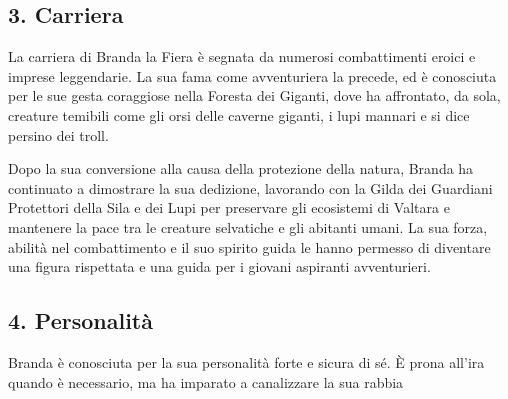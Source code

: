 \subsection{3. Carriera}\label{carriera}


La carriera di Branda la Fiera è segnata da numerosi combattimenti
eroici e imprese leggendarie. La sua fama come avventuriera la precede,
ed è conosciuta per le sue gesta coraggiose nella Foresta dei Giganti,
dove ha affrontato, da sola, creature temibili come gli orsi delle
caverne giganti, i lupi mannari e si dice persino dei troll.

Dopo la sua conversione alla causa della protezione della natura, Branda
ha continuato a dimostrare la sua dedizione, lavorando con la Gilda dei
Guardiani Protettori della Sila e dei Lupi per preservare gli ecosistemi
di Valtara e mantenere la pace tra le creature selvatiche e gli abitanti
umani. La sua forza, abilità nel combattimento e il suo spirito guida le
hanno permesso di diventare una figura rispettata e una guida per i
giovani aspiranti avventurieri.

\subsection{4. Personalità}\label{personalituxe0}


Branda è conosciuta per la sua personalità forte e sicura di sé. È prona
all'ira quando è necessario, ma ha imparato a canalizzare la sua rabbia

